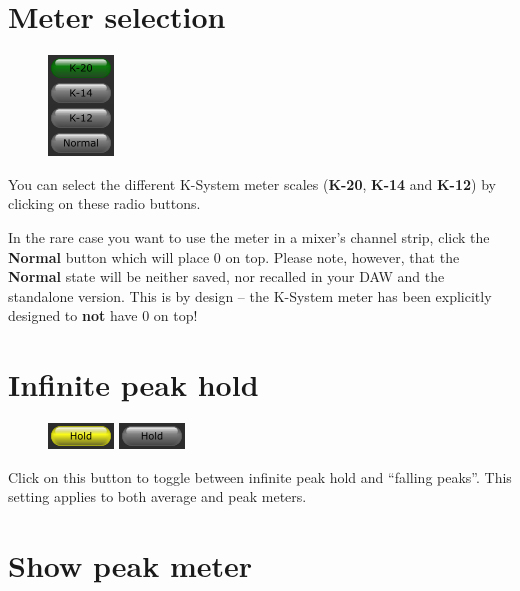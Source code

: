 \section{Meter selection}

\begin{figure}
  \includegraphics[scale=\screenshotscale,clip]{include/images/button_meter_selection.png}
\end{figure}

You can select the different K-System meter scales (\textbf{K-20},
\textbf{K-14} and \textbf{K-12}) by clicking on these radio buttons.

In the rare case you want to use the meter in a mixer's channel strip,
click the \textbf{Normal} button which will place \SI{0}{\dBFS} on
top.  Please note, however, that the \textbf{Normal} state will be
neither saved, nor recalled in your DAW and the standalone version.
This is by design -- the K-System meter has been explicitly designed
to \textbf{not} have \SI{0}{\dBFS} on top!

\section{Infinite peak hold}

\begin{figure}
  \includegraphics[scale=\screenshotscale,clip]{include/images/button_peak_hold_on.png}
  \newline \vspace{-0.9\baselineskip}
  \includegraphics[scale=\screenshotscale,clip]{include/images/button_peak_hold_off.png}
\end{figure}

Click on this button to toggle between infinite peak hold and
``falling peaks''.  This setting applies to both average and peak
meters.

\section{Show peak meter}

